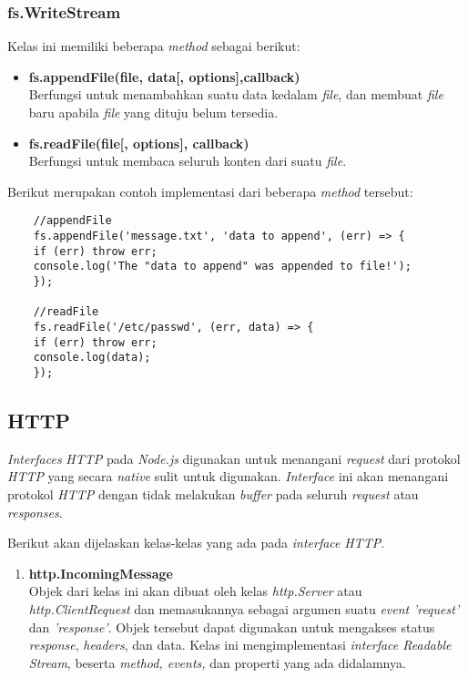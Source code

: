 \subsubsection{fs.WriteStream}
Kelas ini memiliki beberapa \textit{method} sebagai berikut: 

\begin{itemize}
	\item \textbf{fs.appendFile(file, data[, options],callback)} \\ Berfungsi untuk menambahkan suatu data kedalam \textit{file}, dan membuat \textit{file} baru apabila \textit{file} yang dituju belum tersedia.
	\item \textbf{fs.readFile(file[, options], callback)} \\ Berfungsi untuk membaca seluruh konten dari suatu \textit{file}.
\end{itemize}

Berikut merupakan contoh implementasi dari beberapa \textit{method} tersebut:

\begin{lstlisting}
	//appendFile
	fs.appendFile('message.txt', 'data to append', (err) => {
	if (err) throw err;
	console.log('The "data to append" was appended to file!');
	});
	
	//readFile
	fs.readFile('/etc/passwd', (err, data) => {
	if (err) throw err;
	console.log(data);
	});
\end{lstlisting}

\subsection{HTTP}
\textit{Interfaces} \textit{HTTP} pada \textit{Node.js} digunakan untuk menangani \textit{request} dari protokol \textit{HTTP} yang secara \textit{native} sulit untuk digunakan. \textit{Interface} ini akan menangani protokol \textit{HTTP} dengan tidak melakukan \textit{buffer} pada seluruh \textit{request} atau \textit{responses}.

Berikut akan dijelaskan kelas-kelas yang ada pada \textit{interface} \textit{HTTP}.

\begin{enumerate}
	\item \textbf{http.IncomingMessage} \\ 
	Objek dari kelas ini akan dibuat oleh kelas \textit{http.Server} atau \textit{http.ClientRequest} dan memasukannya sebagai argumen suatu \textit{event} \textit{'request'} dan \textit{'response'}. Objek tersebut dapat digunakan untuk mengakses status \textit{response}, \textit{headers}, dan data. Kelas ini mengimplementasi \textit{interface Readable Stream}, beserta \textit{method, events,} dan properti yang ada didalamnya.
	
	
\end{enumerate} 

